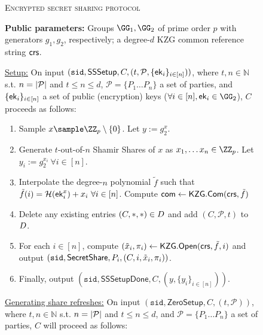 \begin{figure*}
        \centering
        \begin{mdframed}
    \renewcommand{\labelitemi}{\textendash}
    \begin{center}
        \textsc{Encrypted secret sharing protocol}
    \end{center}
    \textbf{Public parameters:} Groups $\GG_1, \GG_2$ of prime order $p$ with generators $g_1,\allowbreak g_2$, respectively; a degree-$d$ KZG common reference string $\mathsf{crs}$.\hfill
    
    \underline{Setup:}
    On input $(\texttt{sid},\mathsf{SSSetup}, C, (t, \mathcal{P}, \{\mathsf{ek}_i\}_{i \in [n]}))$, where $t,n \in \mathbb{N}$ s.t. $n = \lvert \mathcal{P} \rvert$ and $t \leq n \leq d$, $\mathcal{P} = \{P_1 \ldots P_n\}$ a set of parties, and $\{\mathsf{ek}_i\}_{i \in [n]}$ a set of public (encryption) keys ($\forall i \in [n], \ek_i \in \GG_2$), $C$ proceeds as follows:
        \begin{enumerate}
        \item Sample $x \sample \ZZ_p \setminus \{0\}$. 
        Let $y := g_2^x$.
        \item Generate $t$-out-of-$n$ Shamir Shares of $x$ as $x_1, \ldots x_n \in \ZZ_p$. Let $y_i := g_2^{x_i}~\forall i \in [n]$.
        \item Interpolate the degree-$n$ polynomial $\tilde{f}$ such that $\tilde{f}(i) = \mathcal{H}(\mathsf{ek}_i^x) + x_i~\forall i\in [n]$. Compute $\mathsf{com} \gets \mathsf{KZG}.\mathsf{Com}(\mathsf{crs}, \tilde{f})$ %
        \item Delete any existing entries $(C, *, *) \in D$ and add $(C, \mathcal{P}, t)$ to $D$.
        \item For each $i \in [n]$, compute $(\tilde{x}_i, \pi_i) \gets \mathsf{KZG}.\mathsf{Open}(\mathsf{crs}, \tilde{f}, i)$ and output $(\texttt{sid},\mathsf{SecretShare}, P_i,\allowbreak (C, i, \tilde{x}_i, \pi_i))$.
        \item Finally, output $(\texttt{sid}, \mathsf{SSSetupDone}, C, (y, \{y_i\}_{i \in [n]}))$.
        \end{enumerate}
    \underline{Generating share refreshes:}
    On input $(\texttt{sid},\mathsf{ZeroSetup}, C, (t, \mathcal{P}))$, where $t,\allowbreak n \in \mathbb{N}$ s.t. $n = \lvert \mathcal{P} \rvert$ and $t \leq n \leq d$, and $\mathcal{P} = \{P_1 \ldots P_n\}$ a set of parties, $C$ will proceed as follows:

\end{mdframed}
\end{figure*}

